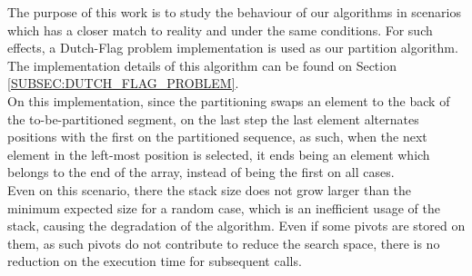 The purpose of this work is to study the behaviour of our algorithms in scenarios which has a closer match to reality and under the same conditions. For such effects, a Dutch-Flag problem implementation is used as our partition algorithm. The implementation details of this algorithm can be found on Section \ref{SUBSEC:DUTCH_FLAG_PROBLEM}.\\

On this implementation, since the partitioning swaps an element to the back of the to-be-partitioned segment, on the last step the last element alternates positions with the first on the partitioned sequence, as such, when the next element in the left-most position is selected, it ends being an element which belongs to the end of the array, instead of being the first on all cases.\\

Even on this scenario, there the stack size does not grow larger than the minimum expected size for a random case, which is an inefficient usage of the stack, causing the degradation of the algorithm. Even if some pivots are stored on them, as such pivots do not contribute to reduce the search space, there is no reduction on the execution time for subsequent calls.\\

